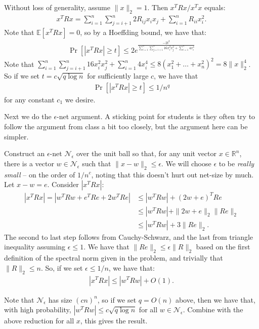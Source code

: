 \documentclass[11pt]{article}
\newcommand{\R}{\mathbb{R}}
\newcommand{\E}{\mathbb{E}}
\begin{document}
Without loss of generality, assume $\|x\|_2 = 1$. Then $x^T R x/x^Tx$ equals:
\begin{align*}
	x^T R x = \sum_{i = 1}^n \sum_{j = i+1}^n  2R_{ij} x_ix_j + \sum_{i = 1}^n R_{ii} x_i^2. 
\end{align*}
Note that $\E[x^TRx] = 0$, so by a Hoeffding bound, we have that:
\begin{align*}
	\Pr[|x^TRx| \geq t] \leq 2e^{\frac{-2t^2}{\sum_{i = 1}^n \sum_{j = i+1}^n  16x_i^2x_j^2 + \sum_{i = 1}^n  4 x_i^4}}
\end{align*}
Note that $\sum_{i = 1}^n \sum_{j = i+1}^n  16x_i^2x_j^2 + \sum_{i = 1}^n  4 x_i^4 \leq 8 (x_1^2 + \ldots + x_n^2)^2 = 8\|x\|_2^4$. So if we set $t = c \sqrt{q\log n}$ for sufficiently large $c$, we have that 
\begin{align*}
	\Pr[|x^TRx| \geq t] \leq 1/n^{q}
\end{align*}
for any constant $c_1$ we desire. 

Next we do the $\epsilon$-net argument. A sticking point for students is they often try to follow the argument from class a bit too closely, but the argument here can be simpler. 

Construct an $\epsilon$-net $\mathcal{N}_\epsilon$ over the unit ball so that, for any unit vector $x\in \R^n$, there is a vector $w \in \mathcal{N}_\epsilon$ such that $\|x - w\|_2 \leq \epsilon$. We will choose $\epsilon$ to be \emph{really small} -- on the order of $1/n^c$, noting that this doesn't hurt out net-size by much. Let $x - w = e$. Consider $|x^T R x|$: 
\begin{align*}
	|x^T R x| = |w^TRw + e^TRe + 2 w^T Re| &\leq |w^TRw| + (2w + e)^TRe
	\\&\leq  |w^TRw|  + \|2w + e\|_2\|Re\|_2
	\\&\leq  |w^TRw|  + 3\|Re\|_2.
\end{align*}
The second to last step follows from Cauchy-Schwarz, and the last from triangle inequality assuming $\epsilon \leq 1$. 
We have that $\|Re\|_2 \leq \epsilon\|R\|_2$ based on the first definition of the spectral norm given in the problem, and trivially that $\|R\|_2 \leq n$. So, if we set $\epsilon \leq 1/n$, we have that:
\begin{align*}
	|x^T R x|  \leq |w^TRw| + O(1). 
\end{align*}

Note that $\mathcal{N}_\epsilon$ has size $(cn)^n$, so if we set $q = O(n)$ above, then we have that, with high probability, $|w^TRw| \leq c\sqrt{q\log n}$ for all $w\in \mathcal{N}_\epsilon$. Combine with the above reduction for all $x$, this gives the result. 

	
\end{document}
